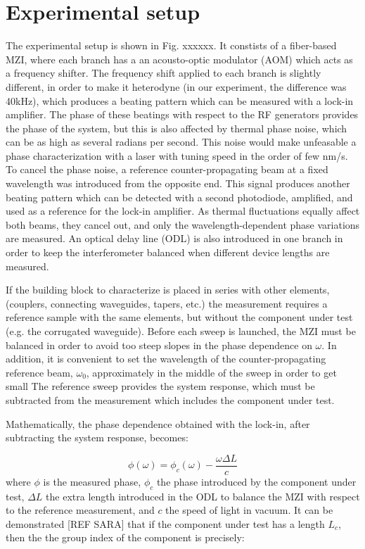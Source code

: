 \documentclass[journal]{IEEEtran}
\begin{document}
\section{Experimental setup}

The experimental setup is shown in Fig. xxxxxx.
It constists of a fiber-based MZI, where each branch has a an acousto-optic modulator (AOM) which acts as a frequency shifter.
The frequency shift applied to each branch is slightly different, in order to make it heterodyne (in our experiment, the difference was 40kHz), which produces a beating pattern which can be measured with a lock-in amplifier. The phase of these beatings with respect to the RF generators provides the phase of the system, but this is also affected by thermal phase noise, which can be as high as several radians per second. This noise would make unfeasable a phase characterization with a laser with tuning speed in the order of few nm/s. To cancel the phase noise, a reference counter-propagating beam at a fixed wavelength was introduced from the opposite end.
This signal produces another beating pattern which can be detected with a second photodiode, amplified, and used as a reference for the lock-in amplifier.
As thermal fluctuations equally affect both beams, they cancel out, and only the wavelength-dependent phase variations are measured. An optical delay line (ODL) is also introduced in one branch in order to keep the interferometer balanced when different device lengths are measured. 


If the building block to characterize is placed in series with other elements, (couplers, connecting waveguides, tapers, etc.) the measurement requires a reference sample with the same elements, but without the component under test (e.g. the corrugated waveguide). Before each sweep is launched, the MZI must be balanced in order to avoid too steep slopes in the phase dependence on $\omega$.
In addition, it is convenient to set the wavelength of the counter-propagating reference beam, $\omega_0$, approximately in the middle of the sweep in order to get small The reference sweep provides the system response, which must be subtracted from the measurement which includes the component under test. 

Mathematically, the phase dependence obtained with the lock-in, after subtracting the system response, becomes:


\begin{equation}
\phi(\omega)=\phi_{c}(\omega)-\frac{\omega\Delta L}{c}
\label{eq:response}
\end{equation}
where $\phi$ is the measured phase, $\phi_{c}$ the phase introduced by the component under test, $\Delta L$ the extra length introduced in the ODL to balance the MZI with respect to the reference measurement, and $c$ the speed of light in vacuum. It can be demonstrated [REF SARA] that if the component under test has a length $L_{c}$, then the the group index of the component is precisely:
\end{document}
